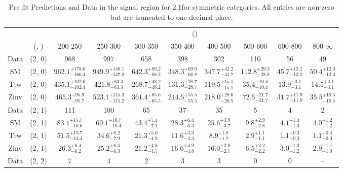 \begin{table}[h!]
\tiny
\centering
\caption{Pre fit Predictions and Data in the signal region for 2.1\ifb for symmetric categories. All entries are non-zero but are truncated to one decimal place.\label{tab:predallnaive_sig_comb_sym}}
\begin{tabular}
{cccccccccc}
	\hline\hline
	&	& \multicolumn{8}{c}{\scalht (\gev)}\\ 
	&	 (\njet, \nb) & 200-250 & 250-300 & 300-350 & 350-400 & 400-500 & 500-600 & 600-800 & 800-$\infty$ \\ [0.8ex] 
\hline
	Data & (2, 0) & 968 & 997 & 658 & 398 & 302 & 110 & 56 & 49 \\[0.5ex] 
	SM & (2, 0) & $962.1^{+ 178.0 }_{- 166.4 }$ & $949.9^{+ 148.1 }_{- 147.8 }$ & $642.3^{+ 89.2 }_{- 88.2 }$ & $348.3^{+ 69.0 }_{- 68.8 }$ & $347.7^{+ 42.2 }_{- 41.7 }$ & $112.8^{+ 29.3 }_{- 28.8 }$ & $45.7^{+ 13.2 }_{- 13.2 }$ & $50.4^{+ 12.3 }_{- 12.3 }$ \\[0.5ex] 
	Ttw & (2, 0) & $435.1^{+ 102.6 }_{- 102.4 }$ & $421.8^{+ 83.4 }_{- 83.3 }$ & $268.7^{+ 48.2 }_{- 48.2 }$ & $131.3^{+ 28.7 }_{- 28.7 }$ & $119.5^{+ 15.1 }_{- 15.1 }$ & $35.4^{+ 10.4 }_{- 10.4 }$ & $13.9^{+ 3.1 }_{- 3.1 }$ & $14.5^{+ 3.1 }_{- 3.1 }$ \\[0.5ex] 
	Zinv & (2, 0) & $465.3^{+ 95.9 }_{- 95.7 }$ & $523.1^{+ 115.3 }_{- 115.2 }$ & $361.4^{+ 65.6 }_{- 65.5 }$ & $214.5^{+ 55.5 }_{- 55.5 }$ & $218.0^{+ 28.6 }_{- 28.5 }$ & $72.5^{+ 21.7 }_{- 21.7 }$ & $31.7^{+ 11.9 }_{- 11.9 }$ & $35.5^{+ 10.5 }_{- 10.5 }$ \\[0.5ex] 
	Data & (2, 1) & 111 & 100 & 65 & 37 & 35 & 5 & 4 & 2 \\[0.5ex] 
	SM & (2, 1) & $83.1^{+ 17.7 }_{- 16.6 }$ & $60.1^{+ 10.7 }_{- 10.4 }$ & $43.4^{+ 7.4 }_{- 7.1 }$ & $28.3^{+ 6.4 }_{- 6.3 }$ & $25.6^{+ 3.9 }_{- 3.7 }$ & $9.8^{+ 2.9 }_{- 2.8 }$ & $4.1^{+ 1.4 }_{- 1.3 }$ & $4.0^{+ 1.2 }_{- 1.2 }$ \\[0.5ex] 
	Ttw & (2, 1) & $51.5^{+ 13.7 }_{- 13.4 }$ & $34.6^{+ 8.2 }_{- 7.9 }$ & $21.3^{+ 5.0 }_{- 4.9 }$ & $11.6^{+ 3.3 }_{- 3.3 }$ & $8.9^{+ 1.8 }_{- 1.7 }$ & $2.9^{+ 1.1 }_{- 1.1 }$ & $1.1^{+ 0.3 }_{- 0.3 }$ & $1.1^{+ 0.4 }_{- 0.3 }$ \\[0.5ex] 
	Zinv & (2, 1) & $26.3^{+ 6.4 }_{- 6.2 }$ & $25.2^{+ 6.4 }_{- 6.3 }$ & $21.2^{+ 4.8 }_{- 4.7 }$ & $16.6^{+ 4.9 }_{- 4.8 }$ & $16.0^{+ 2.8 }_{- 2.7 }$ & $6.5^{+ 2.2 }_{- 2.2 }$ & $3.0^{+ 1.3 }_{- 1.2 }$ & $2.9^{+ 1.1 }_{- 1.0 }$ \\[0.5ex] 
	Data & (2, 2) & 7 & 4 & 2 & 3 & 3 & 0 & 0 & -- \\[0.5ex] 

\end{tabular}
\end{table}

